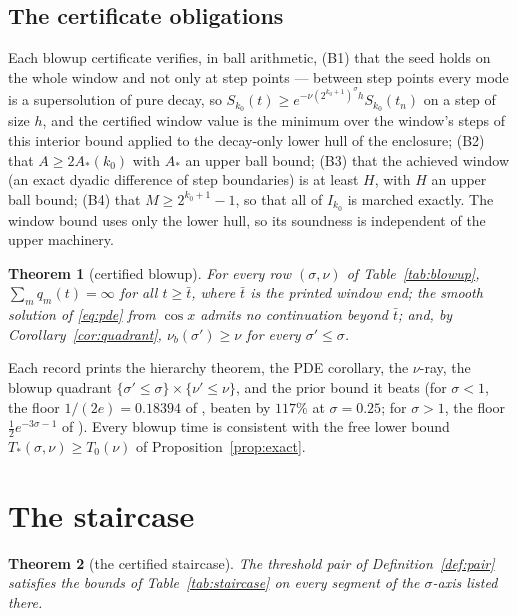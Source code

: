 \documentclass[11pt,a4paper]{article}
\theoremstyle{plain}
\newtheorem{theorem}{Theorem}[section]
\theoremstyle{definition}
\begin{document}
\subsection*{The certificate obligations}
Each blowup certificate verifies, in ball arithmetic, (B1) that the seed holds on the whole window and not only at step points --- between step points every mode is a supersolution of pure decay, so $S_{k_0}(t)\ge e^{-\nu(2^{k_0+1})^\sigma h}S_{k_0}(t_n)$ on a step of size $h$, and the certified window value is the minimum over the window's steps of this interior bound applied to the decay-only lower hull of the enclosure; (B2) that $A\ge2A_*(k_0)$ with $A_*$ an upper ball bound; (B3) that the achieved window (an exact dyadic difference of step boundaries) is at least $H$, with $H$ an upper ball bound; (B4) that $M\ge2^{k_0+1}-1$, so that all of $I_{k_0}$ is marched exactly. The window bound uses only the lower hull, so its soundness is independent of the upper machinery.

\begin{theorem}[certified blowup]\label{thm:blowup}
For every row $(\sigma,\nu)$ of Table~\ref{tab:blowup}, $\sum_mq_m(t)=\infty$ for all $t\ge\bar t$, where $\bar t$ is the printed window end; the smooth solution of \eqref{eq:pde} from $\cos x$ admits no continuation beyond $\bar t$; and, by Corollary~\ref{cor:quadrant}, $\nu_b(\sigma')\ge\nu$ for every $\sigma'\le\sigma$.
\end{theorem}
Each record prints the hierarchy theorem, the PDE corollary, the $\nu$-ray, the blowup quadrant $\{\sigma'\le\sigma\}\times\{\nu'\le\nu\}$, and the prior bound it beats (for $\sigma<1$, the floor $1/(2e)=0.18394$ of \cite[Theorem~9]{Sak03b}, beaten by $117\%$ at $\sigma=0.25$; for $\sigma>1$, the floor $\tfrac12e^{-3\sigma-1}$ of \cite[Theorem~5]{Sak03b}). Every blowup time is consistent with the free lower bound $T_*(\sigma,\nu)\ge T_0(\nu)$ of Proposition~\ref{prop:exact}.

\section{The staircase}\label{sec:staircase}

\begin{theorem}[the certified staircase]\label{thm:staircase}
The threshold pair of Definition~\ref{def:pair} satisfies the bounds of Table~\ref{tab:staircase} on every segment of the $\sigma$-axis listed there.
\end{theorem}
\end{document}
